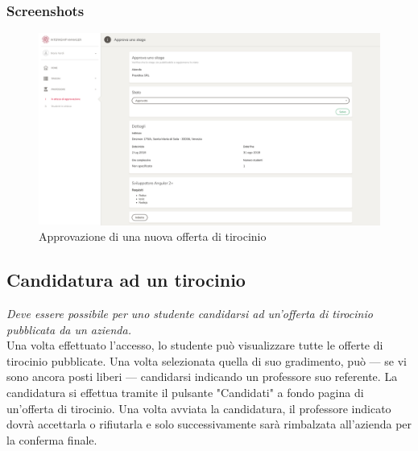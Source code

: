 \subsubsection{Screenshots}
\begin{figure}[H]
	\centering
	\includegraphics[width=1\textwidth]{Chapter3/Figs/screenshots/internshipapprove}     
	\caption[Screenshot: approvazione di una nuova offerta di tirocinio]{Approvazione di una nuova offerta di tirocinio}
	\label{fig:screenshot:3}
\end{figure}

\pagebreak
\subsection{Candidatura ad un tirocinio}\label{sec:candidatura-ad-un-tirocinio}

\textit{Deve essere possibile per uno studente candidarsi ad un'offerta di tirocinio pubblicata da un azienda.} \\

\noindent
Una volta effettuato l'accesso, lo studente può visualizzare tutte le offerte di tirocinio pubblicate. Una volta selezionata quella di suo gradimento, può --- se vi sono ancora posti liberi --- candidarsi indicando un professore suo referente. La candidatura si effettua tramite il pulsante "Candidati" a fondo pagina di un'offerta di tirocinio. Una volta avviata la candidatura, il professore indicato dovrà accettarla o rifiutarla e solo successivamente sarà rimbalzata all'azienda per la conferma finale.

